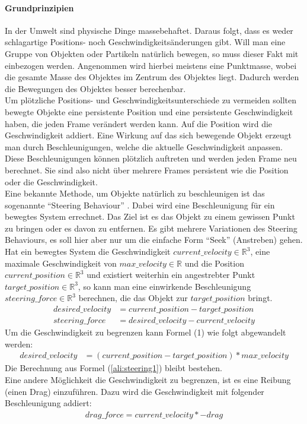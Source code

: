 \documentclass[11pt,a4paper]{article}
\begin{document}
\paragraph{Grundprinzipien}
In der Umwelt sind physische Dinge massebehaftet. Daraus folgt, dass es weder schlagartige Positions- noch Geschwindigkeitsänderungen gibt. Will man eine Gruppe von Objekten oder Partikeln natürlich bewegen, so muss dieser Fakt mit einbezogen werden. Angenommen wird hierbei meistens eine Punktmasse, wobei die gesamte Masse des Objektes im Zentrum des Objektes liegt. Dadurch werden die Bewegungen des Objektes besser berechenbar.\\
Um plötzliche Positions- und Geschwindigkeitsunterschiede zu vermeiden sollten bewegte Objekte eine persistente Position und eine persistente Geschwindigkeit haben, die jeden Frame verändert werden kann. Auf die Position wird die Geschwindigkeit addiert. Eine Wirkung auf das sich bewegende Objekt erzeugt man durch Beschleunigungen, welche die aktuelle Geschwindigkeit anpassen. Diese Beschleunigungen können plötzlich auftreten und werden jeden Frame neu berechnet. Sie sind also nicht über mehrere Frames persistent wie die Position oder die Geschwindigkeit.\\
Eine bekannte Methode, um Objekte natürlich zu beschleunigen ist das sogenannte ``Steering Behaviour'' \cite{580abc6c6615ef9f9c16f9069351938a0dda3c5120b7e8d1450d6b1abf0a71df}. Dabei wird eine Beschleunigung für ein bewegtes System errechnet. Das Ziel ist es das Objekt zu einem gewissen Punkt zu bringen oder es davon zu entfernen. Es gibt mehrere Variationen des Steering Behaviours, es soll hier aber nur um die einfache Form ``Seek'' (Anstreben) gehen.\\
Hat ein bewegtes System die Geschwindigkeit $current\_velocity \in \mathbb{R}^3$, eine maximale Geschwindigkeit von $max\_velocity \in \mathbb{R}$ und die Position $current\_position \in \mathbb{R}^3$ und existiert weiterhin ein angestrebter Punkt $target\_position \in \mathbb{R}^3$, so kann man eine einwirkende Beschleunigung $steering\_force \in \mathbb{R}^3$ berechnen, die das Objekt zur $target\_position$ bringt.
\begin{align}
desired\_velocity &= current\_position - target\_position \\
steering\_force &= desired\_velocity - current\_velocity
\label{ali:steering1}
\end{align}
Um die Geschwindigkeit zu begrenzen kann Formel (1) wie folgt abgewandelt werden:
\begin{align}
desired\_velocity &= (current\_position - target\_position) * max\_velocity
\end{align}
\noindent
Die Berechnung aus Formel (\ref{ali:steering1}) bleibt bestehen.\\
Eine andere Möglichkeit die Geschwindigkeit zu begrenzen, ist es eine Reibung (einen Drag) einzuführen. Dazu wird die Geschwindigkeit mit folgender Beschleunigung addiert:
\begin{align}
drag\_force = current\_velocity * -drag
\end{align}
\end{document}
